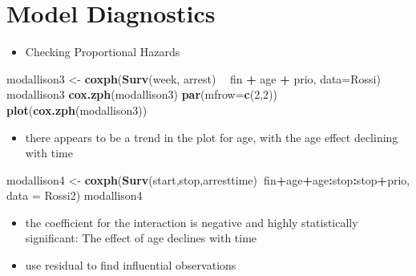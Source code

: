 \documentclass[]{book}
\newenvironment{Shaded}{\begin{snugshade}}{\end{snugshade}}
\newcommand{\DataTypeTok}[1]{\textcolor[rgb]{0.13,0.29,0.53}{#1}}
\newcommand{\DecValTok}[1]{\textcolor[rgb]{0.00,0.00,0.81}{#1}}
\newcommand{\KeywordTok}[1]{\textcolor[rgb]{0.13,0.29,0.53}{\textbf{#1}}}
\newcommand{\NormalTok}[1]{#1}
\newcommand{\OperatorTok}[1]{\textcolor[rgb]{0.81,0.36,0.00}{\textbf{#1}}}
\newcommand{\StringTok}[1]{\textcolor[rgb]{0.31,0.60,0.02}{#1}}
\providecommand{\tightlist}{%
  \setlength{\itemsep}{0pt}\setlength{\parskip}{0pt}}
\begin{document}
\hypertarget{model-diagnostics}{%
\section{Model Diagnostics}\label{model-diagnostics}}

\begin{itemize}
\tightlist
\item
  Checking Proportional Hazards
\end{itemize}

\begin{Shaded}
\begin{Highlighting}[]
\NormalTok{modallison3 <-}\StringTok{ }\KeywordTok{coxph}\NormalTok{(}\KeywordTok{Surv}\NormalTok{(week, arrest) }\OperatorTok{~}\StringTok{ }\NormalTok{fin }\OperatorTok{+}\StringTok{ }\NormalTok{age }\OperatorTok{+}\StringTok{ }\NormalTok{prio, }\DataTypeTok{data=}\NormalTok{Rossi)}
\NormalTok{modallison3}
\KeywordTok{cox.zph}\NormalTok{(modallison3)}
\KeywordTok{par}\NormalTok{(}\DataTypeTok{mfrow=}\KeywordTok{c}\NormalTok{(}\DecValTok{2}\NormalTok{,}\DecValTok{2}\NormalTok{))}
\KeywordTok{plot}\NormalTok{(}\KeywordTok{cox.zph}\NormalTok{(modallison3))}
\end{Highlighting}
\end{Shaded}

\begin{itemize}
\tightlist
\item
  there appears to be a trend in the plot for age, with the age effect declining with time
\end{itemize}

\begin{Shaded}
\begin{Highlighting}[]
\NormalTok{modallison4 <-}\StringTok{ }\KeywordTok{coxph}\NormalTok{(}\KeywordTok{Surv}\NormalTok{(start,stop,arresttime)}\OperatorTok{~}\NormalTok{fin}\OperatorTok{+}\NormalTok{age}\OperatorTok{+}\NormalTok{age}\OperatorTok{:}\NormalTok{stop}\OperatorTok{:}\NormalTok{stop}\OperatorTok{+}\NormalTok{prio, }\DataTypeTok{data =}\NormalTok{ Rossi2)}
\NormalTok{modallison4}
\end{Highlighting}
\end{Shaded}

\begin{itemize}
\item
  the coefficient for the interaction is negative and highly statistically significant: The effect of age declines with time
\item
  use residual to find influential observations
\end{itemize}
\end{document}
